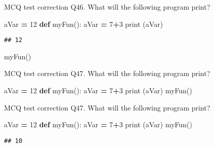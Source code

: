 \documentclass[
  8pt,
  ignorenonframetext,
]{beamer}
\newenvironment{Shaded}{\begin{snugshade}}{\end{snugshade}}
\newcommand{\BuiltInTok}[1]{#1}
\newcommand{\DecValTok}[1]{\textcolor[rgb]{0.00,0.00,0.81}{#1}}
\newcommand{\KeywordTok}[1]{\textcolor[rgb]{0.13,0.29,0.53}{\textbf{#1}}}
\newcommand{\NormalTok}[1]{#1}
\newcommand{\OperatorTok}[1]{\textcolor[rgb]{0.81,0.36,0.00}{\textbf{#1}}}
\begin{document}
\begin{frame}[fragile]{MCQ test correction}
\protect\hypertarget{mcq-test-correction-91}{}
Q46. What will the following program print?

\begin{Shaded}
\begin{Highlighting}[]
\NormalTok{aVar }\OperatorTok{=} \DecValTok{12}
\KeywordTok{def}\NormalTok{ myFun():}
\NormalTok{    aVar }\OperatorTok{=} \DecValTok{7}\OperatorTok{+}\DecValTok{3}
\BuiltInTok{print}\NormalTok{ (aVar)}
\end{Highlighting}
\end{Shaded}

\begin{verbatim}
## 12
\end{verbatim}

\begin{Shaded}
\begin{Highlighting}[]
\NormalTok{myFun()}
\end{Highlighting}
\end{Shaded}
\end{frame}

\begin{frame}[fragile]{MCQ test correction}
\protect\hypertarget{mcq-test-correction-92}{}
Q47. What will the following program print?

\begin{Shaded}
\begin{Highlighting}[]
\NormalTok{aVar }\OperatorTok{=} \DecValTok{12}
\KeywordTok{def}\NormalTok{ myFun():}
\NormalTok{    aVar }\OperatorTok{=} \DecValTok{7}\OperatorTok{+}\DecValTok{3}
    \BuiltInTok{print}\NormalTok{ (aVar)}
\NormalTok{myFun()}
\end{Highlighting}
\end{Shaded}
\end{frame}

\begin{frame}[fragile]{MCQ test correction}
\protect\hypertarget{mcq-test-correction-93}{}
Q47. What will the following program print?

\begin{Shaded}
\begin{Highlighting}[]
\NormalTok{aVar }\OperatorTok{=} \DecValTok{12}
\KeywordTok{def}\NormalTok{ myFun():}
\NormalTok{    aVar }\OperatorTok{=} \DecValTok{7}\OperatorTok{+}\DecValTok{3}
    \BuiltInTok{print}\NormalTok{ (aVar)}
\NormalTok{myFun()}
\end{Highlighting}
\end{Shaded}

\begin{verbatim}
## 10
\end{verbatim}
\end{frame}
\end{document}
